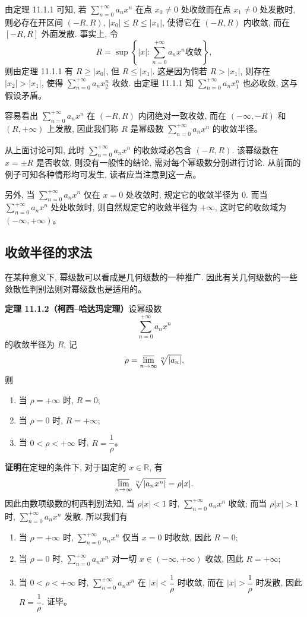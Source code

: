 \documentclass[UTF8,12pt,a4paper,fontset=fandol]{ctexart}
\begin{document}
由定理 11.1.1 可知, 若 $\sum_{n=0}^{+\infty}a_nx^n$ 在点 $x_0\ne0$ 处收敛而在点 $x_1\ne0$ 处发散时, 则必存在开区间 $(-R,R)$, $|x_0|\leqslant R\leqslant |x_1|$, 使得它在 $(-R,R)$ 内收敛, 而在 $[-R,R]$ 外面发散. 事实上, 令
\[
  R=\sup\left\{|x|:\sum_{n=0}^{+\infty}a_nx^n\text{收敛}\right\},
\]
则由定理 11.1.1 有 $R\geqslant |x_0|$, 但 $R\leqslant |x_1|$. 这是因为倘若 $R>|x_1|$, 则存在 $|x_2|>|x_1|$, 使得 $\sum_{n=0}^{+\infty}a_nx_2^n$ 收敛. 由定理 11.1.1 知 $\sum_{n=0}^{+\infty}a_nx_1^n$ 也必收敛, 这与假设矛盾。

容易看出 $\sum_{n=0}^{+\infty}a_nx^n$ 在 $(-R,R)$ 内闭绝对一致收敛, 而在 $(-\infty,-R)$ 和 $(R,+\infty)$ 上发散, 因此我们称 $R$ 是幂级数 $\sum_{n=0}^{+\infty}a_nx^n$ 的收敛半径。

从上面讨论可知, 此时 $\sum_{n=0}^{+\infty}a_nx^n$ 的收敛域必包含 $(-R,R)$. 该幂级数在 $x=\pm R$ 是否收敛, 则没有一般性的结论, 需对每个幂级数分别进行讨论. 从前面的例子可知各种情形均可发生, 读者应当注意到这一点。

另外, 当 $\sum_{n=0}^{+\infty}a_nx^n$ 仅在 $x=0$ 处收敛时, 规定它的收敛半径为 $0$. 而当 $\sum_{n=0}^{+\infty}a_nx^n$ 处处收敛时, 则自然规定它的收敛半径为 $+\infty$, 这时它的收敛域为 $(-\infty,+\infty)$。

\subsection{收敛半径的求法}

在某种意义下, 幂级数可以看成是几何级数的一种推广. 因此有关几何级数的一些敛散性判别法则对幂级数也是适用的。

\noindent\textbf{定理 11.1.2（柯西--哈达玛定理）}\quad 设幂级数
\[
  \sum_{n=0}^{+\infty}a_nx^n
\]
的收敛半径为 $R$, 记
\[
  \rho=\varlimsup_{n\to\infty}\sqrt[n]{|a_n|},
\]
则
\begin{enumerate}
  \item 当 $\rho=+\infty$ 时, $R=0$;
  \item 当 $\rho=0$ 时, $R=+\infty$;
  \item 当 $0<\rho<+\infty$ 时, $R=\dfrac1\rho$。
\end{enumerate}

\noindent\textbf{证明}\quad 在定理的条件下, 对于固定的 $x\in\mathbb R$, 有
\[
  \varlimsup_{n\to\infty}\sqrt[n]{|a_nx^n|}
  =
  \rho|x|.
\]
因此由数项级数的柯西判别法知, 当 $\rho|x|<1$ 时, $\sum_{n=0}^{+\infty}a_nx^n$ 收敛; 而当 $\rho|x|>1$ 时, $\sum_{n=0}^{+\infty}a_nx^n$ 发散. 所以我们有
\begin{enumerate}
  \item 当 $\rho=+\infty$ 时, $\sum_{n=0}^{+\infty}a_nx^n$ 仅当 $x=0$ 时收敛, 因此 $R=0$;
  \item 当 $\rho=0$ 时, $\sum_{n=0}^{+\infty}a_nx^n$ 对一切 $x\in(-\infty,+\infty)$ 收敛, 因此 $R=+\infty$;
  \item 当 $0<\rho<+\infty$ 时, $\sum_{n=0}^{+\infty}a_nx^n$ 在 $|x|<\dfrac1\rho$ 时收敛, 而在 $|x|>\dfrac1\rho$ 时发散, 因此 $R=\dfrac1\rho$. 证毕。
\end{enumerate}
\end{document}
